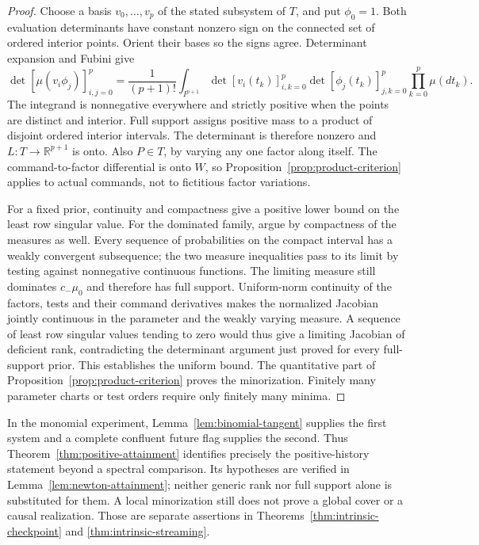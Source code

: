 \documentclass[11pt]{amsart}
\theoremstyle{definition}\newtheorem{definition}[theorem]{Definition}
\theoremstyle{remark}\newtheorem{remark}[theorem]{Remark}
\newcommand{\R}{\mathbb R}\newcommand{\N}{\mathbb N}\newcommand{\C}{\mathbb C}
\begin{document}
\begin{proof}
Choose a basis $v_0,\ldots,v_p$ of the stated subsystem of $T$, and put
$\phi_0=1$. Both evaluation determinants have constant nonzero sign on
the connected set of ordered interior points. Orient their bases so the
signs agree. Determinant expansion and Fubini give
\[
 \det[\mu(v_i\phi_j)]_{i,j=0}^p
 =\frac1{(p+1)!}\int_{I^{p+1}}
       \det[v_i(t_k)]_{i,k=0}^p
       \det[\phi_j(t_k)]_{j,k=0}^p\prod_{k=0}^p\mu(dt_k).
\]
The integrand is nonnegative everywhere and strictly positive when the
points are distinct and interior. Full support assigns positive mass to
a product of disjoint ordered interior intervals. The determinant is
therefore nonzero and $L:T\to\R^{p+1}$ is onto. Also $P\in T$, by
varying any one factor along itself. The command-to-factor differential
is onto $W$, so Proposition~\ref{prop:product-criterion} applies to
actual commands, not to fictitious factor variations.

For a fixed prior, continuity and compactness give a positive lower
bound on the least row singular value. For the dominated family, argue
by compactness of the measures as well. Every sequence of probabilities
on the compact interval has a weakly convergent subsequence; the two
measure inequalities pass to its limit by testing against nonnegative
continuous functions. The limiting measure still dominates $c_-\mu_0$
and therefore has full support. Uniform-norm continuity of the factors,
tests and their command derivatives makes the normalized Jacobian jointly
continuous in the parameter and the weakly varying measure. A sequence
of least row singular values tending to zero would thus give a limiting
Jacobian of deficient rank, contradicting the determinant argument just
proved for every full-support prior. This establishes the uniform bound.
The quantitative part of
Proposition~\ref{prop:product-criterion} proves the minorization. Finitely
many parameter charts or test orders require only finitely many minima.
\end{proof}

In the monomial experiment, Lemma~\ref{lem:binomial-tangent} supplies the
first system and a complete confluent future flag supplies the second.
Thus Theorem~\ref{thm:positive-attainment} identifies precisely the
positive-history statement beyond a spectral comparison. Its hypotheses
are verified in Lemma~\ref{lem:newton-attainment}; neither generic rank
nor full support alone is substituted for them. A local minorization
still does not prove a global cover or a causal realization. Those are
separate assertions in Theorems~\ref{thm:intrinsic-checkpoint} and
\ref{thm:intrinsic-streaming}.
\end{document}
